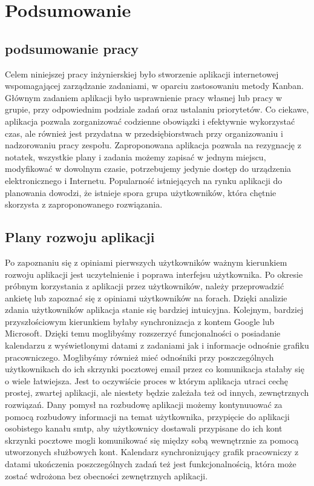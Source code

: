 \chapter{Podsumowanie}

\section{podsumowanie pracy}
\thispagestyle{chapterBeginStyle}

Celem niniejszej pracy inżynierskiej było stworzenie aplikacji internetowej wspomagającej zarządzanie zadaniami, w oparciu zastosowaniu metody Kanban.  Głównym zadaniem aplikacji było usprawnienie pracy własnej lub pracy w grupie, przy odpowiednim podziale zadań oraz ustalaniu priorytetów. Co ciekawe, aplikacja pozwala zorganizować codzienne obowiązki i efektywnie wykorzystać czas, ale również jest przydatna w przedsiębiorstwach przy organizowaniu i nadzorowaniu pracy zespołu. Zaproponowana aplikacja pozwala na rezygnację z notatek, wszystkie plany i zadania możemy zapisać w jednym miejscu, modyfikować w dowolnym czasie, potrzebujemy jedynie dostęp do urządzenia elektronicznego i Internetu. Popularność istniejących na rynku aplikacji do planowania dowodzi, że istnieje spora grupa użytkowników, która chętnie skorzysta z zaproponowanego rozwiązania. 

\section{Plany rozwoju aplikacji}
Po zapoznaniu się z opiniami pierwszych użytkowników ważnym kierunkiem rozwoju aplikacji jest uczytelnienie i poprawa interfejsu użytkownika. Po okresie próbnym korzystania z aplikacji przez użytkowników, należy przeprowadzić ankietę lub zapoznać się z opiniami użytkowników na forach. Dzięki analizie zdania użytkowników aplikacja stanie się bardziej intuicyjna.
Kolejnym, bardziej przyszłościowym kierunkiem byłaby synchronizacja z kontem Google lub Microsoft. Dzięki temu moglibyśmy rozszerzyć funcjonalności o posiadanie kalendarzu z wyświetlonymi datami z zadaniami jak i informacje odnośnie grafiku pracowniczego. Moglibyśmy również mieć odnośniki przy poszczególnych użytkownikach do ich skrzynki pocztowej email przez co komunikacja stałaby się o wiele łatwiejsza.  Jest to oczywiście proces w którym aplikacja utraci cechę  prostej, zwartej aplikacji, ale niestety będzie zależała też od innych, zewnętrznych rozwiązań. Dany pomysł na rozbudowę aplikacji możemy kontynuuować za pomocą rozbudowy informacji na temat użytkownika, przypięcie do aplikacji osobistego kanału smtp, aby użytkownicy dostawali przypisane do ich kont skrzynki pocztowe mogli komunikować się między sobą wewnętrznie za pomocą utworzonych służbowych kont. Kalendarz synchronizujący grafik pracowniczy z datami ukończenia poszczególnych zadań też jest  funkcjonalnością, która może zostać wdrożona bez obecności zewnętrznych aplikacji.

